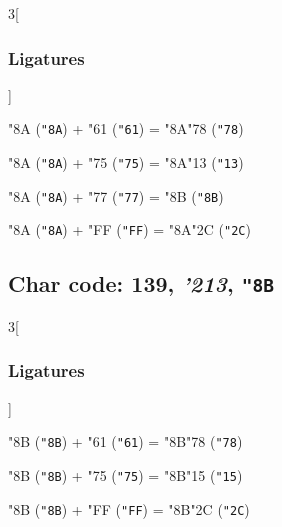 \documentclass{article}
\newlength{\maxcharwidth}
\begin{document}
\begin{multicols}{3}[\subsubsection{Ligatures}]

{\testfont\char"8A\noboundary} ({\tt"8A}) + {\testfont\char"61\noboundary} ({\tt"61}) = {\testfont\char"8A\noboundary}{\testfont\char"78\noboundary} ({\tt"78}) 

{\testfont\char"8A\noboundary} ({\tt"8A}) + {\testfont\char"75\noboundary} ({\tt"75}) = {\testfont\char"8A\noboundary}{\testfont\char"13\noboundary} ({\tt"13}) 

{\testfont\char"8A\noboundary} ({\tt"8A}) + {\testfont\char"77\noboundary} ({\tt"77}) = {\testfont\char"8B\noboundary} ({\tt"8B}) 

{\testfont\char"8A\noboundary} ({\tt"8A}) + {\testfont\char"FF\noboundary} ({\tt"FF}) = {\testfont\char"8A\noboundary}{\testfont\char"2C\noboundary} ({\tt"2C}) 

\end{multicols}

\subsection{Char code: 139, {\it'213}, {\tt"8B}}
\label{char_139}


\begin{multicols}{3}[\subsubsection{Ligatures}]

{\testfont\char"8B\noboundary} ({\tt"8B}) + {\testfont\char"61\noboundary} ({\tt"61}) = {\testfont\char"8B\noboundary}{\testfont\char"78\noboundary} ({\tt"78}) 

{\testfont\char"8B\noboundary} ({\tt"8B}) + {\testfont\char"75\noboundary} ({\tt"75}) = {\testfont\char"8B\noboundary}{\testfont\char"15\noboundary} ({\tt"15}) 

{\testfont\char"8B\noboundary} ({\tt"8B}) + {\testfont\char"FF\noboundary} ({\tt"FF}) = {\testfont\char"8B\noboundary}{\testfont\char"2C\noboundary} ({\tt"2C}) 

\end{multicols}
\end{document}
